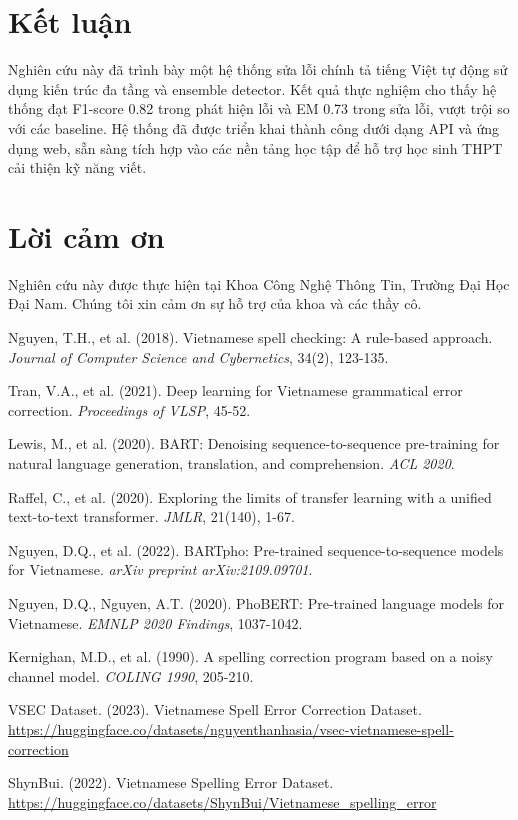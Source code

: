 \documentclass[conference]{IEEEtran}
\begin{document}
\section{Kết luận}
Nghiên cứu này đã trình bày một hệ thống sửa lỗi chính tả tiếng Việt tự động sử dụng kiến trúc đa tầng và ensemble detector. Kết quả thực nghiệm cho thấy hệ thống đạt F1-score 0.82 trong phát hiện lỗi và EM 0.73 trong sửa lỗi, vượt trội so với các baseline. Hệ thống đã được triển khai thành công dưới dạng API và ứng dụng web, sẵn sàng tích hợp vào các nền tảng học tập để hỗ trợ học sinh THPT cải thiện kỹ năng viết.

\section*{Lời cảm ơn}
Nghiên cứu này được thực hiện tại Khoa Công Nghệ Thông Tin, Trường Đại Học Đại Nam. Chúng tôi xin cảm ơn sự hỗ trợ của khoa và các thầy cô.

\begin{thebibliography}{9}

Nguyen, T.H., et al. (2018). Vietnamese spell checking: A rule-based approach. \textit{Journal of Computer Science and Cybernetics}, 34(2), 123-135.

Tran, V.A., et al. (2021). Deep learning for Vietnamese grammatical error correction. \textit{Proceedings of VLSP}, 45-52.

Lewis, M., et al. (2020). BART: Denoising sequence-to-sequence pre-training for natural language generation, translation, and comprehension. \textit{ACL 2020}.

Raffel, C., et al. (2020). Exploring the limits of transfer learning with a unified text-to-text transformer. \textit{JMLR}, 21(140), 1-67.

Nguyen, D.Q., et al. (2022). BARTpho: Pre-trained sequence-to-sequence models for Vietnamese. \textit{arXiv preprint arXiv:2109.09701}.

Nguyen, D.Q., Nguyen, A.T. (2020). PhoBERT: Pre-trained language models for Vietnamese. \textit{EMNLP 2020 Findings}, 1037-1042.

Kernighan, M.D., et al. (1990). A spelling correction program based on a noisy channel model. \textit{COLING 1990}, 205-210.

VSEC Dataset. (2023). Vietnamese Spell Error Correction Dataset. \url{https://huggingface.co/datasets/nguyenthanhasia/vsec-vietnamese-spell-correction}

ShynBui. (2022). Vietnamese Spelling Error Dataset. \url{https://huggingface.co/datasets/ShynBui/Vietnamese_spelling_error}

\end{thebibliography}
\end{document}
